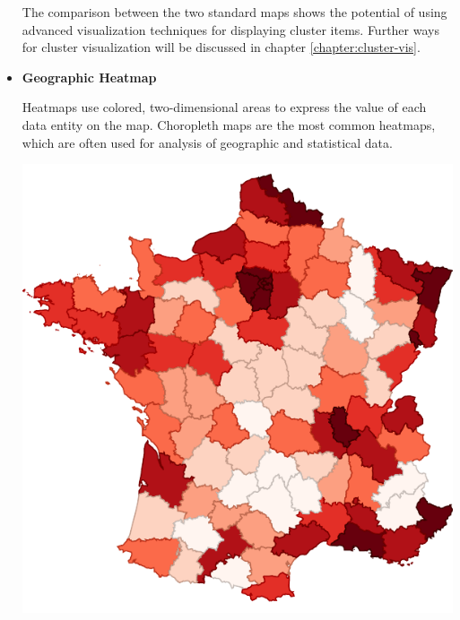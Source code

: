 \begin{itemize}
\begin{itemize}
\end {itemize}

The comparison between the two standard maps shows the potential of using advanced visualization techniques for displaying cluster items. Further ways for cluster visualization will be discussed in chapter \ref{chapter:cluster-vis}.

\item \textbf{Geographic Heatmap}

Heatmaps use colored, two-dimensional areas to express the value of each data entity on the map. Choropleth maps are the most common heatmaps, which are often used for analysis of geographic and statistical data. 

\parbox [h]{0.4\textwidth}{
    \includegraphics [width=\linewidth]{figures/map_types_choropleth.pdf}
    \label{fig:map-type-choropleth}
}
\hfill
\hspace{0.5cm}
\parbox [h]{0.4\textwidth}{
}
\end{itemize}
